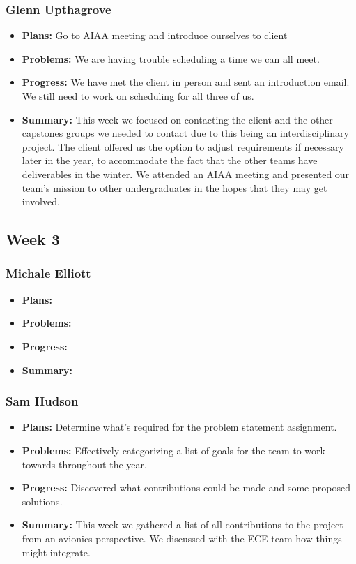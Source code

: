 \documentclass[onecolumn, draftclsnofoot,10pt, compsoc]{IEEEtran}
\begin{document}
\subsubsection{Glenn Upthagrove}
\begin {itemize}
 \item \textbf{Plans: }Go to AIAA meeting and introduce ourselves to client
 \item \textbf{Problems: }We are having trouble scheduling a time we can all meet.
 \item \textbf{Progress: }We have met the client in person and sent an introduction email. We still need to work on scheduling for all three of us. 
 \item \textbf{Summary: }This week we focused on contacting the client and the other capstones groups we needed to contact due to this being an interdisciplinary project. The client offered us the option to adjust requirements if necessary later in the year, to accommodate the fact that the other teams have deliverables in the winter. We attended an AIAA meeting and presented our team's mission to other undergraduates in the hopes that they may get involved. 
\end {itemize}
\subsection {Week 3}
\subsubsection{Michale Elliott}
\begin {itemize}
 \item \textbf{Plans: }
 \item \textbf{Problems: }
 \item \textbf{Progress: }
 \item \textbf{Summary: }
\end {itemize}
\subsubsection{Sam Hudson}
\begin {itemize}
\item \textbf{Plans: }Determine what’s required for the problem statement assignment.
\item \textbf{Problems: }Effectively categorizing a list of goals for the team to work towards throughout the year.
\item \textbf{Progress: }Discovered what contributions could be made and some proposed solutions.
\item \textbf{Summary: }This week we gathered a list of all contributions to the project from an avionics perspective. We discussed with the ECE team how things might integrate.
\end {itemize}
\end{document}
